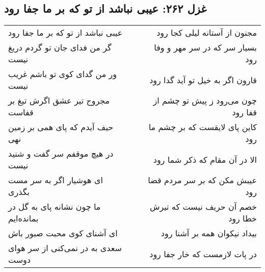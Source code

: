 \begin{center}
\section*{غزل ۲۶۲: عیبی نباشد از تو که بر ما جفا رود}
\label{sec:262}
\begin{longtable}{l p{0.5cm} r}
عیبی نباشد از تو که بر ما جفا رود
&&
مجنون از آستانه لیلی کجا رود
\\
گر من فدای جان تو گردم دریغ نیست
&&
بسیار سر که در سر مهر و وفا رود
\\
ور من گدای کوی تو باشم غریب نیست
&&
قارون اگر به خیل تو آید گدا رود
\\
مجروح تیر عشق اگرش تیغ بر قفاست
&&
چون می‌رود ز پیش تو چشم از قفا رود
\\
حیف آیدم که پای همی بر زمین نهی
&&
کاین پای لایقست که بر چشم ما رود
\\
در هیچ موقفم سر گفت و شنید نیست
&&
الا در آن مقام که ذکر شما رود
\\
ای هوشیار اگر به سر مست بگذری
&&
عیبش مکن که بر سر مردم قضا رود
\\
ما چون نشانه پای به گل در بمانده‌ایم
&&
خصم آن حریف نیست که تیرش خطا رود
\\
ای آشنای کوی محبت صبور باش
&&
بیداد نیکوان همه بر آشنا رود
\\
سعدی به در نمی‌کنی از سر هوای دوست
&&
در پات لازمست که خار جفا رود
\\
\end{longtable}
\end{center}
